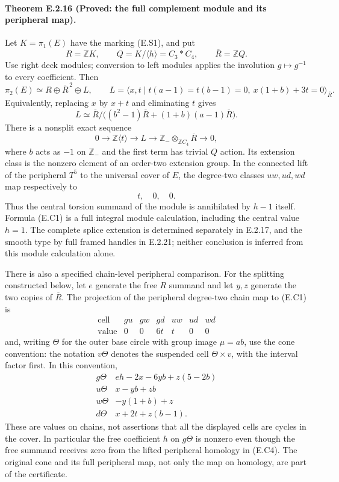 \paragraph{Theorem E.2.16 (Proved: the full complement module and its peripheral map).}
Let $K=\pi_1(E)$ have the marking (E.S1), and put
\[
 R=\mathbb ZK,\qquad Q=K/\langle h\rangle=C_3*C_4,
 \qquad \overline R=\mathbb ZQ.
\]
Use right deck modules; conversion to left modules applies the
involution $g\mapsto g^{-1}$ to every coefficient. Then
\[
 \pi_2(E)\simeq R\oplus\overline R^{\,2}\oplus L,
 \qquad
 L=\langle x,t\mid t(a-1)=t(b-1)=0,
                         \ x(1+b)+3t=0\rangle_{\overline R}.
 \tag{E.C1}
\]
Equivalently, replacing $x$ by $x+t$ and eliminating $t$ gives
\[
 L\simeq\overline R\big/
       \big((b^2-1)\overline R+(1+b)(a-1)\overline R\big).
 \tag{E.C2}
\]
There is a nonsplit exact sequence
\[
 0\longrightarrow\mathbb Z\langle t\rangle
  \longrightarrow L\longrightarrow
  \mathbb Z_{-}\otimes_{\mathbb ZC_4}\overline R
  \longrightarrow0,
 \tag{E.C3}
\]
where $b$ acts as $-1$ on $\mathbb Z_{-}$ and the first term
has trivial $Q$ action. Its extension class is the nonzero
element of an order-two extension group. In the connected
lift of the peripheral $T^5$ to the universal cover of $E$,
the degree-two classes $uw,ud,wd$ map respectively to
\[
                           t,\quad0,\quad0.
 \tag{E.C4}
\]
Thus the central torsion summand of the module is annihilated
by $h-1$ itself. Formula (E.C1) is a full integral module
calculation, including the central value $h=1$.  The complete
splice extension is determined separately in E.2.17, and the
smooth type by full framed handles in E.2.21; neither conclusion
is inferred from this module calculation alone.

There is also a specified chain-level peripheral comparison.
For the splitting constructed below, let $e$ generate the
free $R$ summand and let $y,z$ generate the two copies of
$\overline R$. The projection of the peripheral degree-two
chain map to (E.C1) is
\[
 \begin{array}{c|rrrrrr}
 \text{cell}&gu&gw&gd&uw&ud&wd\\ \hline
 \text{value}&0&0&6t&t&0&0
 \end{array}
 \tag{E.C19a}
\]
and, writing $\Theta$ for the outer base circle with
group image $\mu=ab$, use the cone convention: the
notation $v\Theta$ denotes the suspended cell
$\Theta\times v$, with the interval factor first.
In this convention,
\[
 \begin{array}{c|l}
  g\Theta&eh-2x-6yb+z(5-2b)\\
  u\Theta&x-yb+zb\\
  w\Theta&-y(1+b)+z\\
  d\Theta&x+2t+z(b-1).
 \end{array}
 \tag{E.C19b}
\]
These are values on chains, not assertions that all
the displayed cells are cycles in the cover. In
particular the free coefficient $h$ on $g\Theta$
is nonzero even though the free summand receives
zero from the lifted peripheral homology in (E.C4).
The original cone and its full peripheral map, not
only the map on homology, are part of the certificate.

